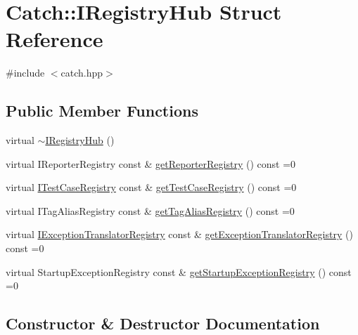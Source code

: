 \hypertarget{struct_catch_1_1_i_registry_hub}{}\section{Catch\+::I\+Registry\+Hub Struct Reference}
\label{struct_catch_1_1_i_registry_hub}


{\ttfamily \#include $<$catch.\+hpp$>$}

\subsection*{Public Member Functions}
\begin{DoxyCompactItemize}
\item 
virtual \mbox{\hyperlink{struct_catch_1_1_i_registry_hub_a050de0f27f96888c8b410992146c9a09}{$\sim$\+I\+Registry\+Hub}} ()
\item 
virtual I\+Reporter\+Registry const  \& \mbox{\hyperlink{struct_catch_1_1_i_registry_hub_a55534563f7ecf7e20ec1e37285ebe54d}{get\+Reporter\+Registry}} () const =0
\item 
virtual \mbox{\hyperlink{struct_catch_1_1_i_test_case_registry}{I\+Test\+Case\+Registry}} const  \& \mbox{\hyperlink{struct_catch_1_1_i_registry_hub_af4f6255f0c0f8f1f179fa9d7d4843076}{get\+Test\+Case\+Registry}} () const =0
\item 
virtual I\+Tag\+Alias\+Registry const  \& \mbox{\hyperlink{struct_catch_1_1_i_registry_hub_a3c511b1d33e5a6d95c333a0ff387df1a}{get\+Tag\+Alias\+Registry}} () const =0
\item 
virtual \mbox{\hyperlink{struct_catch_1_1_i_exception_translator_registry}{I\+Exception\+Translator\+Registry}} const  \& \mbox{\hyperlink{struct_catch_1_1_i_registry_hub_a48347c170d9c583af73027a27b2f0bd4}{get\+Exception\+Translator\+Registry}} () const =0
\item 
virtual Startup\+Exception\+Registry const  \& \mbox{\hyperlink{struct_catch_1_1_i_registry_hub_a00281210628e6c616aca1d3e0d84db04}{get\+Startup\+Exception\+Registry}} () const =0
\end{DoxyCompactItemize}


\subsection{Constructor \& Destructor Documentation}
\mbox{\label{struct_catch_1_1_i_registry_hub_a050de0f27f96888c8b410992146c9a09}} 
